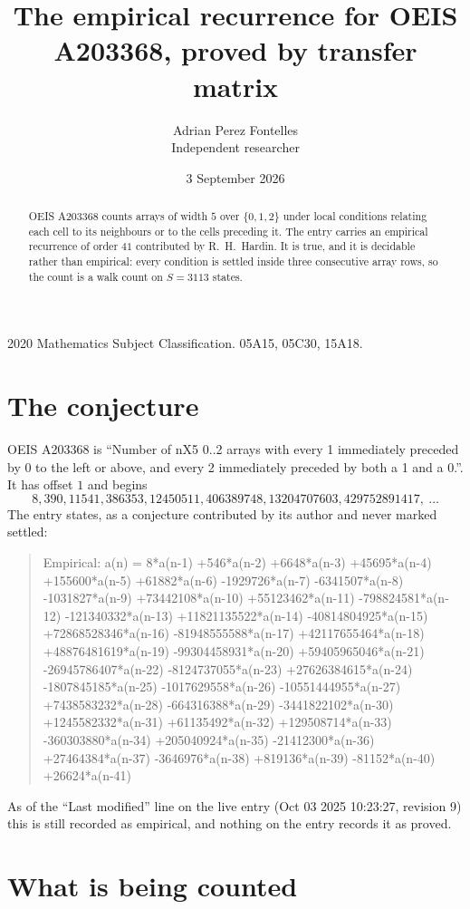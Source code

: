 \documentclass[11pt,a4paper]{article}
\title{The empirical recurrence for OEIS A203368, proved by transfer matrix}
\author{Adrian Perez Fontelles\\ \small Independent researcher}
\date{3 September 2026}
\theoremstyle{plain}
\theoremstyle{definition}
\begin{document}
\maketitle

\begin{abstract}
OEIS A203368 counts arrays of width $5$ over $\{0,1,2\}$ under local conditions relating each cell
to its neighbours or to the cells preceding it. The entry carries an empirical recurrence of
order $41$ contributed by R.~H.~Hardin. It is true, and it is decidable rather than
empirical: every condition is settled inside three consecutive array rows, so the count is a
walk count on $S=3113$ states.
\end{abstract}

\noindent\small 2020 Mathematics Subject Classification. 05A15, 05C30, 15A18.\normalsize

\section{The conjecture}

OEIS A203368 is ``Number of nX5 0..2 arrays with every 1 immediately preceded by 0 to the left or above, and every 2 immediately preceded by both a 1 and a 0.''. It has offset $1$ and begins
\[
8, 390, 11541, 386353, 12450511, 406389748, 13204707603, 429752891417,\ \dots
\]
The entry states, as a conjecture contributed by its author and never marked settled:
\begin{quote}
Empirical: a(n) = 8*a(n-1) +546*a(n-2) +6648*a(n-3) +45695*a(n-4) +155600*a(n-5) +61882*a(n-6) -1929726*a(n-7) -6341507*a(n-8) -1031827*a(n-9) +73442108*a(n-10) +55123462*a(n-11) -798824581*a(n-12) -121340332*a(n-13) +11821135522*a(n-14) -40814804925*a(n-15) +72868528346*a(n-16) -81948555588*a(n-17) +42117655464*a(n-18) +48876481619*a(n-19) -99304458931*a(n-20) +59405965046*a(n-21) -26945786407*a(n-22) -8124737055*a(n-23) +27626384615*a(n-24) -1807845185*a(n-25) -1017629558*a(n-26) -10551444955*a(n-27) +7438583232*a(n-28) -664316388*a(n-29) -3441822102*a(n-30) +1245582332*a(n-31) +61135492*a(n-32) +129508714*a(n-33) -360303880*a(n-34) +205040924*a(n-35) -21412300*a(n-36) +27464384*a(n-37) -3646976*a(n-38) +819136*a(n-39) -81152*a(n-40) +26624*a(n-41)
\end{quote}
As of the ``Last modified'' line on the live entry (Oct 03 2025 10:23:27, revision 9) this is still
recorded as empirical, and nothing on the entry records it as proved.

\section{What is being counted}
\end{document}
